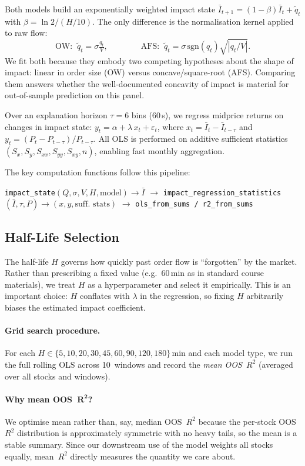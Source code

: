 \documentclass[11pt,a4paper]{article}
\begin{document}
Both models build an exponentially weighted impact state
$\bar I_{t+1}=(1{-}\beta)\bar I_t + \tilde q_t$
with $\beta=\ln 2/(H/10)$.
The only difference is the normalisation kernel applied to raw flow:
\[
  \text{OW:}\;\;\tilde q_t = \sigma\tfrac{q_t}{V},
  \qquad\qquad
  \text{AFS:}\;\;\tilde q_t = \sigma\,\mathrm{sgn}(q_t)\sqrt{|q_t/V|}.
\]
We fit both because they embody two competing hypotheses about the
shape of impact: linear in order size (OW) versus concave/square-root
(AFS).  Comparing them answers whether the well-documented concavity
of impact is material for out-of-sample prediction on this panel.

Over an explanation horizon $\tau{=}6$ bins (60\,s), we regress
midprice returns on changes in impact state:
$y_t = \alpha + \lambda\,x_t + \varepsilon_t$,
where $x_t=\bar I_t - \bar I_{t-\tau}$ and
$y_t=(P_t-P_{t-\tau})/P_{t-\tau}$.
All OLS is performed on additive sufficient statistics
$(S_x,S_y,S_{xx},S_{yy},S_{xy},n)$, enabling fast monthly aggregation.

The key computation functions follow this pipeline:

\smallskip
\noindent
\texttt{impact\_state}$(Q, \sigma, V, H, \text{model}) \to \bar I$
\;\;$\longrightarrow$\;\;
\texttt{impact\_regression\_statistics}$(\bar I, \tau, P) \to (x,y,\text{suff.\ stats})$
\;\;$\longrightarrow$\;\;
\texttt{ols\_from\_sums / r2\_from\_sums}

\subsection{Half-Life Selection}
\label{sec:halflife}

The half-life $H$ governs how quickly past order flow is ``forgotten''
by the market.  Rather than prescribing a fixed value (e.g.\ 60\,min as
in standard course materials), we treat $H$ as a hyperparameter and
select it empirically.  This is an important choice: $H$ conflates with
$\lambda$ in the regression, so fixing $H$ arbitrarily biases the
estimated impact coefficient.

\paragraph{Grid search procedure.}
For each $H\in\{5,10,20,30,45,60,90,120,180\}$\,min and each model
type, we run the full rolling OLS across 10~windows and record the
\emph{mean OOS~$R^2$} (averaged over all stocks and windows).

\paragraph{Why mean OOS~$\boldsymbol{R^2}$?}
We optimise mean rather than, say, median OOS~$R^2$ because the
per-stock OOS~$R^2$ distribution is approximately symmetric with no
heavy tails, so the mean is a stable summary.  Since our downstream use
of the model weights all stocks equally, mean~$R^2$ directly measures
the quantity we care about.
\end{document}

